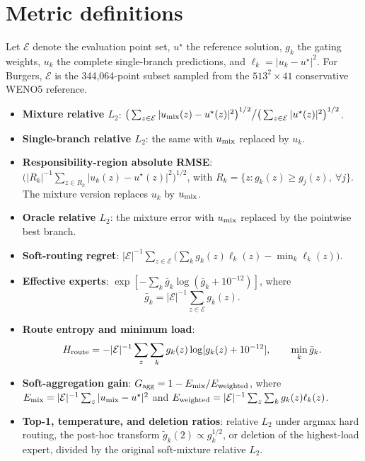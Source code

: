 \documentclass[preprint,12pt]{elsarticle}
\begin{document}
\section{Metric definitions}
\label{app:metrics}

Let $\mathcal E$ denote the evaluation point set, $u^\star$ the reference solution, $g_k$ the gating weights, $u_k$ the complete single-branch predictions, and $\ell_k=|u_k-u^\star|^2$. For Burgers, $\mathcal E$ is the 344,064-point subset sampled from the $513^2\times41$ conservative WENO5 reference.

\begin{itemize}[nosep]
  \item \textbf{Mixture relative $L_2$}: $\big(\sum_{z\in\mathcal E}|u_{\rm mix}(z)-u^\star(z)|^2\big)^{1/2}\big/\big(\sum_{z\in\mathcal E}|u^\star(z)|^2\big)^{1/2}$.
  \item \textbf{Single-branch relative $L_2$}: the same with $u_{\rm mix}$ replaced by $u_k$.
  \item \textbf{Responsibility-region absolute RMSE}: $\big(|R_k|^{-1}\sum_{z\in R_k}|u_k(z)-u^\star(z)|^2\big)^{1/2}$, with $R_k=\{z:g_k(z)\ge g_j(z),\ \forall j\}$. The mixture version replaces $u_k$ by $u_{\rm mix}$.
  \item \textbf{Oracle relative $L_2$}: the mixture error with $u_{\rm mix}$ replaced by the pointwise best branch.
  \item \textbf{Soft-routing regret}: $|\mathcal E|^{-1}\sum_{z\in\mathcal E}\big(\sum_k g_k(z)\ell_k(z)-\min_k\ell_k(z)\big)$.
  \item \textbf{Effective experts}: $\exp[-\sum_k\bar g_k\log(\bar g_k+10^{-12})]$, where
  \[\bar g_k=|\mathcal E|^{-1}\sum_{z\in\mathcal E}g_k(z).\]
  \item \textbf{Route entropy and minimum load}:
  \[H_{\rm route}=-|\mathcal E|^{-1}\sum_z\sum_kg_k(z)\log[g_k(z)+10^{-12}],\qquad \min_k\bar g_k.\]
  \item \textbf{Soft-aggregation gain}: $G_{\rm agg}=1-E_{\rm mix}/E_{\rm weighted}$, where $E_{\rm mix}=|\mathcal E|^{-1}\sum_z|u_{\rm mix}-u^\star|^2$ and $E_{\rm weighted}=|\mathcal E|^{-1}\sum_z\sum_k g_k(z)\ell_k(z)$.
  \item \textbf{Top-1, temperature, and deletion ratios}: relative $L_2$ under argmax hard routing, the post-hoc transform $\widetilde g_k(2)\propto g_k^{1/2}$, or deletion of the highest-load expert, divided by the original soft-mixture relative $L_2$.
\end{itemize}
\end{document}
